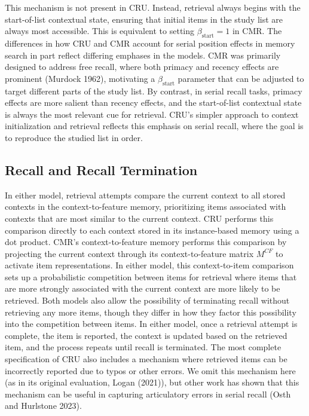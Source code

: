 \documentclass[
  letterpaper,
  DIV=11,
  numbers=noendperiod]{scrartcl}
\begin{document}
This mechanism is not present in CRU. Instead, retrieval always begins
with the start-of-list contextual state, ensuring that initial items in
the study list are always most accessible. This is equivalent to setting
\(\beta_\text{start} = 1\) in CMR. The differences in how CRU and CMR
account for serial position effects in memory search in part reflect
differing emphases in the models. CMR was primarily designed to address
free recall, where both primacy and recency effects are prominent
(Murdock 1962), motivating a \(\beta_\text{start}\) parameter that can
be adjusted to target different parts of the study list. By contrast, in
serial recall tasks, primacy effects are more salient than recency
effects, and the start-of-list contextual state is always the most
relevant cue for retrieval. CRU's simpler approach to context
initialization and retrieval reflects this emphasis on serial recall,
where the goal is to reproduce the studied list in order.

\subsection{Recall and Recall
Termination}\label{recall-and-recall-termination}

In either model, retrieval attempts compare the current context to all
stored contexts in the context-to-feature memory, prioritizing items
associated with contexts that are most similar to the current context.
CRU performs this comparison directly to each context stored in its
instance-based memory using a dot product. CMR's context-to-feature
memory performs this comparison by projecting the current context
through its context-to-feature matrix \(M^{CF}\) to activate item
representations. In either model, this context-to-item comparison sets
up a probabilistic competition between items for retrieval where items
that are more strongly associated with the current context are more
likely to be retrieved. Both models also allow the possibility of
terminating recall without retrieving any more items, though they differ
in how they factor this possibility into the competition between items.
In either model, once a retrieval attempt is complete, the item is
reported, the context is updated based on the retrieved item, and the
process repeats until recall is terminated. The most complete
specification of CRU also includes a mechanism where retrieved items can
be incorrectly reported due to typos or other errors. We omit this
mechanism here (as in its original evaluation, Logan (2021)), but other
work has shown that this mechanism can be useful in capturing
articulatory errors in serial recall (Osth and Hurlstone 2023).
\end{document}
